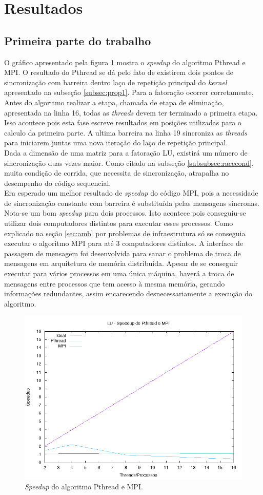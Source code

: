 \documentclass[12pt]{article}
\newcommand\tab[1][1cm]{\hspace*{#1}}
\begin{document}
\section{Resultados}\label{sec:res}
\subsection{Primeira parte do trabalho}\label{subsec:res1}

\tab O gráfico apresentado pela figura \ref{fig:luspeedup} mostra o \textit{speedup} do algoritmo Pthread e MPI. O resultado do Pthread se dá pelo fato de existirem dois pontos de sincronização com barreira dentro laço de repetição principal do \textit{kernel} apresentado na subseção \ref{subsec:prop1}. Para a fatoração ocorrer corretamente, Antes do algoritmo realizar a etapa, chamada de etapa de eliminação, apresentada na linha 16, todas as \textit{threads} devem ter terminado a primeira etapa. Isso acontece pois esta fase escreve resultados em posições utilizadas para o calculo da primeira parte. A ultima barreira na linha 19 sincroniza as \textit{threads} para iniciarem juntas uma nova iteração do laço de repetição principal.
\\
\tab Dada a dimensão de uma matriz para a fatoração LU, existirá um número de sincronização duas vezes maior. Como citado na subseção \ref{subsubsec:racecond}, muita condição de corrida, que necessita de sincronização, atrapalha no desempenho do código sequencial.
\\
\tab Era esperado um melhor resultado de \textit{speedup} do código MPI, pois a necessidade de sincronização constante com barreira é substituída pelas mensagens síncronas. Nota-se um bom \textit{speedup} para dois processos. Isto acontece pois conseguiu-se utilizar dois computadores distintos para executar esses processos. Como explicado na seção \ref{sec:amb} por problemas de infraestrutura só se conseguia executar o algoritmo MPI para até 3 computadores distintos. A interface de passagem de mensagem foi desenvolvida para sanar o problema de troca de mensagens em arquitetura de memória distribuída. Apesar de se conseguir executar para vários processos em uma única máquina, haverá a troca de mensagens entre processos que tem acesso à mesma memória, gerando informações redundantes, assim encarecendo desnecessariamente a execução do algoritmo.

\begin{figure}[H]
\centering
\includegraphics[width=.5\textwidth]{lu-speedup.png}
\caption{\textit{Speedup} do algoritmo Pthread e MPI.}
\label{fig:luspeedup}
\end{figure}
\end{document}

